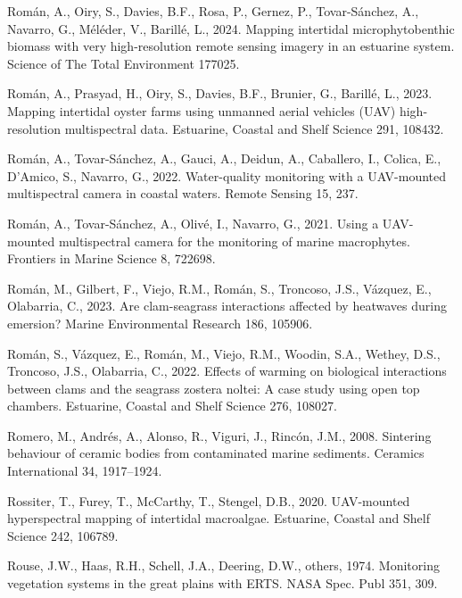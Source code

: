 \documentclass[
  letterpaper,
  11pt,
  english,
  singlespacing,
  headsepline]{MastersDoctoralThesis}
\newlength{\cslhangindent}
\newenvironment{CSLReferences}[2] %
 {\begin{list}{}{%
  \setlength{\itemindent}{0pt}
  \setlength{\leftmargin}{0pt}
  \setlength{\parsep}{0pt}
  \ifodd #1
   \setlength{\leftmargin}{\cslhangindent}
   \setlength{\itemindent}{-1\cslhangindent}
  \fi
  \setlength{\itemsep}{#2\baselineskip}}}
 {\end{list}}
\begin{document}
\begin{CSLReferences}{1}{0}
Román, A., Oiry, S., Davies, B.F., Rosa, P., Gernez, P., Tovar-Sánchez,
A., Navarro, G., Méléder, V., Barillé, L., 2024. Mapping intertidal
microphytobenthic biomass with very high-resolution remote sensing
imagery in an estuarine system. Science of The Total Environment 177025.

Román, A., Prasyad, H., Oiry, S., Davies, B.F., Brunier, G., Barillé,
L., 2023. Mapping intertidal oyster farms using unmanned aerial vehicles
(UAV) high-resolution multispectral data. Estuarine, Coastal and Shelf
Science 291, 108432.

Román, A., Tovar-Sánchez, A., Gauci, A., Deidun, A., Caballero, I.,
Colica, E., D'Amico, S., Navarro, G., 2022. Water-quality monitoring
with a UAV-mounted multispectral camera in coastal waters. Remote
Sensing 15, 237.

Román, A., Tovar-Sánchez, A., Olivé, I., Navarro, G., 2021. Using a
UAV-mounted multispectral camera for the monitoring of marine
macrophytes. Frontiers in Marine Science 8, 722698.

Román, M., Gilbert, F., Viejo, R.M., Román, S., Troncoso, J.S., Vázquez,
E., Olabarria, C., 2023. Are clam-seagrass interactions affected by
heatwaves during emersion? Marine Environmental Research 186, 105906.

Román, S., Vázquez, E., Román, M., Viejo, R.M., Woodin, S.A., Wethey,
D.S., Troncoso, J.S., Olabarria, C., 2022. Effects of warming on
biological interactions between clams and the seagrass zostera noltei: A
case study using open top chambers. Estuarine, Coastal and Shelf Science
276, 108027.

Romero, M., Andrés, A., Alonso, R., Viguri, J., Rincón, J.M., 2008.
Sintering behaviour of ceramic bodies from contaminated marine
sediments. Ceramics International 34, 1917--1924.

Rossiter, T., Furey, T., McCarthy, T., Stengel, D.B., 2020. UAV-mounted
hyperspectral mapping of intertidal macroalgae. Estuarine, Coastal and
Shelf Science 242, 106789.

Rouse, J.W., Haas, R.H., Schell, J.A., Deering, D.W., others, 1974.
Monitoring vegetation systems in the great plains with ERTS. NASA Spec.
Publ 351, 309.


\end{CSLReferences}
\end{document}
